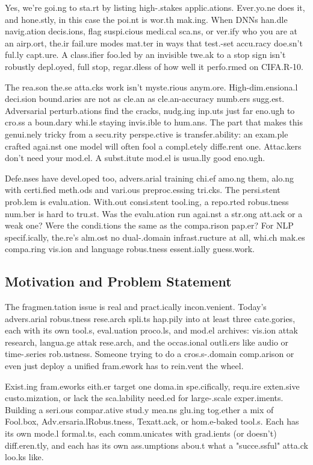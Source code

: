 \documentclass[10pt,conference]{IEEEtran}
\begin{document}
Yes, we're goi.ng to sta.rt by listing high-.stakes applic.ations. Ever.yo.ne does it, and hone.stly, in this case the poi.nt is wor.th mak.ing. When DNNs han.dle navig.ation decis.ions, flag suspi.cious medi.cal sca.ns, or ver.ify who you are at an airp.ort, the.ir fail.ure modes mat.ter in ways that test.-set accu.racy doe.sn't ful.ly capt.ure. A class.ifier foo.led by an invisible twe.ak to a stop sign isn't robustly depl.oyed, full stop, regar.dless of how well it perfo.rmed on CIFA.R-10.

The rea.son the.se atta.cks work isn't myste.rious anym.ore. High-dim.ensiona.l deci.sion bound.aries are not as cle.an as cle.an-accuracy numb.ers sugg.est. Adversarial perturb.ations find the cracks, nudg.ing inp.uts just far eno.ugh to cro.ss a boun.dary whi.le staying invis.ible to hum.ans. The part that makes this genui.nely tricky from a secu.rity perspe.ctive is transfer.ability: an exam.ple crafted agai.nst one model will often fool a compl.etely diffe.rent one. Attac.kers don't need your mod.el. A subst.itute mod.el is usua.lly good eno.ugh.

Defe.nses have devel.oped too, advers.arial training chi.ef amo.ng them, alo.ng with certi.fied meth.ods and vari.ous preproc.essing tri.cks. The persi.stent prob.lem is evalu.ation. With.out consi.stent tool.ing, a repo.rted robus.tness num.ber is hard to tru.st. Was the evalu.ation run agai.nst a str.ong att.ack or a weak one? Were the condi.tions the same as the compa.rison pap.er? For NLP specif.ically, the.re's alm.ost no dual-.domain infrast.ructure at all, whi.ch mak.es compa.ring vis.ion and language robus.tness essent.ially guess.work.

\subsection{Motivation and Problem Statement}

The fragmen.tation issue is real and pract.ically incon.venient. Today's advers.arial robus.tness rese.arch spli.ts hap.pily into at least three cate.gories, each with its own tool.s, eval.uation proco.ls, and mod.el archives: vis.ion attak research, langua.ge attak rese.arch, and the occas.ional outli.ers like audio or time-.series rob.ustness. Someone trying to do a cros.s-.domain comp.arison or even just deploy a unified fram.ework has to rein.vent the wheel.

Exist.ing fram.eworks eith.er target one doma.in spe.cifically, requ.ire exten.sive custo.mization, or lack the sca.lability need.ed for large-.scale exper.iments. Building a seri.ous compar.ative stud.y mea.ns glu.ing tog.ether a mix of Fool.box, Adv.ersaria.lRobus.tness, Texatt.ack, or hom.e-baked tool.s. Each has its own mode.l formal.ts, each comm.unicates with grad.ients (or doesn't) diff.eren.tly, and each has its own ass.umptions abou.t what a "succe.ssful" atta.ck loo.ks like.
\end{document}
